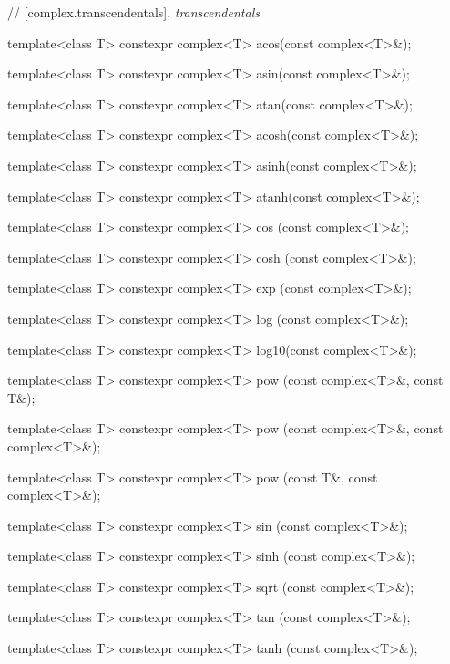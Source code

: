 \documentclass[prd,twocolumn,amsmath,amssymb,nofootinbib,eqsecnum]{revtex4-1}
\newcommand{\code}[1]{{\tt #1}}
\newcommand{\highlight}[1]{{\color{green} #1}}
\begin{document}
\vspace{2ex}

// [complex.transcendentals], {\it transcendentals}

\code{

\vspace{2ex}
  template<class T> \highlight{constexpr} complex<T> acos(const complex<T>\&);

  template<class T> \highlight{constexpr} complex<T> asin(const complex<T>\&);

  template<class T> \highlight{constexpr} complex<T> atan(const complex<T>\&);

\vspace{2ex}

  template<class T> \highlight{constexpr} complex<T> acosh(const complex<T>\&);

  template<class T> \highlight{constexpr} complex<T> asinh(const complex<T>\&);

  template<class T> \highlight{constexpr} complex<T> atanh(const complex<T>\&);

\vspace{2ex}

  template<class T> \highlight{constexpr} complex<T> cos  (const complex<T>\&);

  template<class T> \highlight{constexpr} complex<T> cosh (const complex<T>\&);

  template<class T> \highlight{constexpr} complex<T> exp  (const complex<T>\&);

  template<class T> \highlight{constexpr} complex<T> log  (const complex<T>\&);

  template<class T> \highlight{constexpr} complex<T> log10(const complex<T>\&);

\vspace{2ex}

  template<class T> \highlight{constexpr} complex<T> pow  (const complex<T>\&, const T\&);

  template<class T> \highlight{constexpr} complex<T> pow  (const complex<T>\&, const complex<T>\&);

  template<class T> \highlight{constexpr} complex<T> pow  (const T\&, const complex<T>\&);

\vspace{2ex}

  template<class T> \highlight{constexpr} complex<T> sin  (const complex<T>\&);

  template<class T> \highlight{constexpr} complex<T> sinh (const complex<T>\&);

  template<class T> \highlight{constexpr} complex<T> sqrt (const complex<T>\&);

  template<class T> \highlight{constexpr} complex<T> tan  (const complex<T>\&);

  template<class T> \highlight{constexpr} complex<T> tanh (const complex<T>\&);
}
\end{document}
